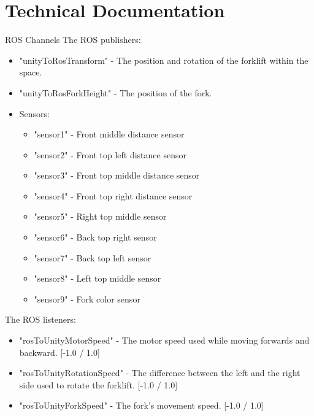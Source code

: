 \documentclass{article}
\begin{document}
\section{Technical Documentation}
\vspace{0.25cm}
\Large \>ROS Channels \vspace{0.5cm}
\newline
\normalsize The ROS publishers:
\begin{itemize}
    \item "unityToRosTransform" - The position and rotation of the forklift within the space.
    \item "unityToRosForkHeight" - The position of the fork.
    \item Sensors: 
    \begin{itemize}
        \item "sensor1" - Front middle distance sensor
        \item "sensor2" - Front top left distance sensor
        \item "sensor3" - Front top middle distance sensor
        \item "sensor4" - Front top right distance sensor
        \item "sensor5" - Right top middle sensor
        \item "sensor6" - Back top right sensor
        \item "sensor7" - Back top left sensor
        \item "sensor8" - Left top middle sensor
        \item "sensor9" - Fork color sensor
    \end{itemize}
\end{itemize}
The ROS listeners:
\begin{itemize}
    \item "rosToUnityMotorSpeed" - The motor speed used while moving forwards and backward. [-1.0 / 1.0]
    \item "rosToUnityRotationSpeed" - The difference between the left and the right side used to rotate the forklift. [-1.0 / 1.0]
    \item "rosToUnityForkSpeed" - The fork's movement speed. [-1.0 / 1.0]
\end{itemize}
\end{document}

